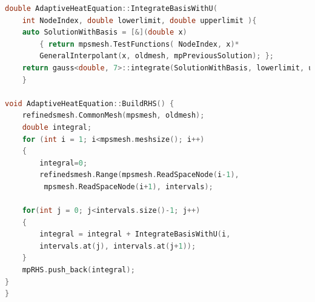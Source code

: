 \documentclass{uonmathreport}
\theoremstyle{definition}
\theoremstyle{problem}
\theoremstyle{theorem}
\begin{document}
\begin{lstlisting}[language=C++]
double AdaptiveHeatEquation::IntegrateBasisWithU( 
	int NodeIndex, double lowerlimit, double upperlimit ){
    auto SolutionWithBasis = [&](double x)
        { return mpsmesh.TestFunctions( NodeIndex, x)*
        GeneralInterpolant(x, oldmesh, mpPreviousSolution); };
    return gauss<double, 7>::integrate(SolutionWithBasis, lowerlimit, upperlimit);
	}

void AdaptiveHeatEquation::BuildRHS() {
	refinedsmesh.CommonMesh(mpsmesh, oldmesh);
	double integral;
	for (int i = 1; i<mpsmesh.meshsize(); i++)
	{
    	integral=0;
    	refinedsmesh.Range(mpsmesh.ReadSpaceNode(i-1),
    	 mpsmesh.ReadSpaceNode(i+1), intervals);

    for(int j = 0; j<intervals.size()-1; j++)
    {
        integral = integral + IntegrateBasisWithU(i, 
        intervals.at(j), intervals.at(j+1));
    }
    mpRHS.push_back(integral);
}
}

\end{lstlisting}

\newpage

	
	
\end{document}
